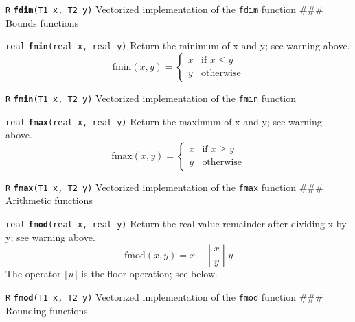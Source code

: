 \documentclass[
  10pt,
]{book}
\begin{document}

\texttt{R} \textbf{\texttt{fdim}}\texttt{(T1\ x,\ T2\ y)}\newline
Vectorized implementation of the \texttt{fdim} function
\#\#\# Bounds functions


\texttt{real} \textbf{\texttt{fmin}}\texttt{(real\ x,\ real\ y)}\newline
Return the minimum of x and y; see warning above.
\[ \text{fmin}(x,y) = \begin{cases} x &
\text{if } x \leq y \\ y & \text{otherwise} \end{cases} \]


\texttt{R} \textbf{\texttt{fmin}}\texttt{(T1\ x,\ T2\ y)}\newline
Vectorized implementation of the \texttt{fmin} function

\texttt{real} \textbf{\texttt{fmax}}\texttt{(real\ x,\ real\ y)}\newline
Return the maximum of x and y; see warning above.
\[ \text{fmax}(x,y) = \begin{cases} x &
\text{if } x \geq y \\ y & \text{otherwise} \end{cases} \]


\texttt{R} \textbf{\texttt{fmax}}\texttt{(T1\ x,\ T2\ y)}\newline
Vectorized implementation of the \texttt{fmax} function
\#\#\# Arithmetic functions


\texttt{real} \textbf{\texttt{fmod}}\texttt{(real\ x,\ real\ y)}\newline
Return the real value remainder after dividing x by y; see warning above.
\[ \text{fmod}(x,y) = x - \left\lfloor \frac{x}{y} \right\rfloor \, y \]
The operator \(\lfloor u \rfloor\) is the floor operation; see below.


\texttt{R} \textbf{\texttt{fmod}}\texttt{(T1\ x,\ T2\ y)}\newline
Vectorized implementation of the \texttt{fmod} function
\#\#\# Rounding functions
\end{document}
